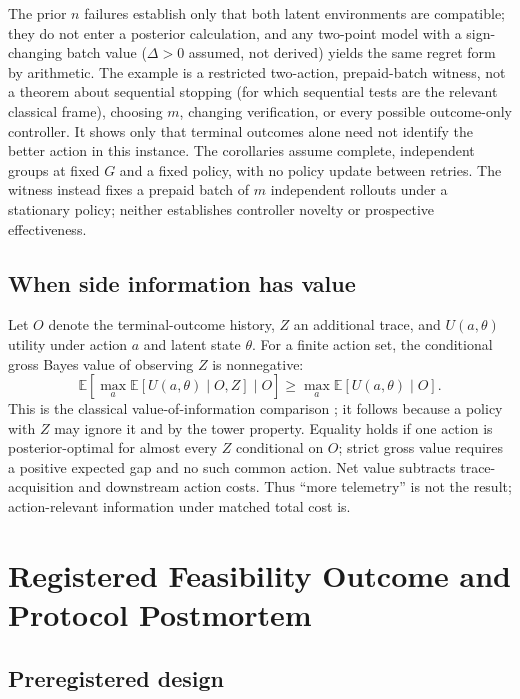 \documentclass{article}
\newcommand{\E}{\mathbb{E}}
\begin{document}
The prior $n$ failures establish only that both latent environments are
compatible; they do not enter a posterior calculation, and any two-point
model with a sign-changing batch value ($\Delta>0$ assumed, not derived)
yields the same regret form by arithmetic.  The example is a restricted
two-action, prepaid-batch witness, not a theorem about sequential stopping
(for which sequential tests \citep{wald1945sequential} are the relevant
classical frame), choosing $m$, changing verification, or every possible
outcome-only controller.  It shows only that terminal outcomes alone need
not identify the better action in this instance.  The corollaries assume
complete, independent groups at fixed $G$ and a fixed policy, with no policy
update between retries. The witness instead fixes a prepaid batch of $m$
independent rollouts under a stationary policy; neither establishes controller
novelty or prospective effectiveness.

\subsection{When side information has value}

Let $O$ denote the terminal-outcome history, $Z$ an additional trace, and
$U(a,\theta)$ utility under action $a$ and latent state $\theta$.  For a finite
action set, the conditional gross Bayes value of observing $Z$ is nonnegative:
\begin{equation}
  \E\!\left[\max_a \E[U(a,\theta)\mid O,Z]\mid O\right]
  \geq
  \max_a \E[U(a,\theta)\mid O].
  \label{eq:value-information}
\end{equation}
This is the classical value-of-information comparison
\citep{blackwell1953equivalent}; it follows because a policy with $Z$ may
ignore it and by the tower property.
Equality holds if one action is posterior-optimal for almost every $Z$
conditional on $O$; strict gross value requires a positive expected gap and no
such common action.  Net value subtracts trace-acquisition and downstream action
costs.  Thus ``more telemetry'' is not the result; action-relevant information
under matched total cost is.

\section{Registered Feasibility Outcome and Protocol Postmortem}
\label{sec:campaign}

\subsection{Preregistered design}
\end{document}
